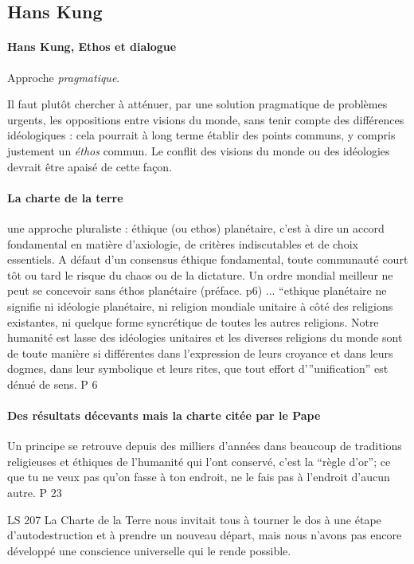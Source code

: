 \subsection{Hans Kung}


\paragraph{Hans Kung, Ethos et dialogue} Approche \textit{pragmatique}. 
\begin{singlequote}
            Il faut plutôt chercher à atténuer, par une solution pragmatique de problèmes urgents, les oppositions entre visions du monde, sans tenir compte des différences idéologiques : cela pourrait à long terme établir des points communs, y compris justement un \textit{éthos} commun. Le conflit des visions du monde ou des idéologies devrait être apaisé de cette façon. \cite{kung_lethique_2009}
\end{singlequote}


\paragraph{La charte de la terre} 
\begin{singlequote}
    une approche pluraliste :
éthique (ou ethos) planétaire, c’est à dire un accord fondamental en matière d’axiologie, de critères indiscutables et de choix essentiels. A défaut d’un consensus éthique fondamental, toute communauté court tôt ou tard le risque du chaos ou de la dictature.  Un ordre mondial meilleur ne peut se concevoir sans éthos planétaire  \cite{kuschel_manifeste_1995}
(préface. p6) 
{...}
“ethique planétaire ne signifie ni idéologie planétaire, ni religion mondiale unitaire à côté des religions existantes, ni quelque forme syncrétique de toutes les autres religions. Notre humanité est lasse des idéologies unitaires et les diverses religions du monde sont de toute manière si différentes dans l’expression de leurs croyance et dans leurs dogmes, dans leur symbolique et leurs rites, que tout effort d’”unification” est dénué de sens. P 6

\end{singlequote}

\paragraph{Des résultats décevants mais la charte citée  par le Pape}  
\begin{singlequote}
    Un principe se retrouve depuis des milliers d’années dans beaucoup de traditions religieuses et éthiques de l’humanité qui l’ont conservé, c’est la “règle d’or”; ce que tu ne veux pas qu’on fasse à ton endroit, ne le fais pas à l’endroit d’aucun autre. \cite{kuschel_manifeste_1995} P 23
\end{singlequote}
\begin{singlequote}
     \cite{noauthor_charte_2022} LS 207 La Charte de la Terre nous invitait tous à tourner le dos à une étape d’autodestruction et à prendre un nouveau départ, mais nous n’avons pas encore développé une conscience universelle qui le rende possible.
\end{singlequote}

